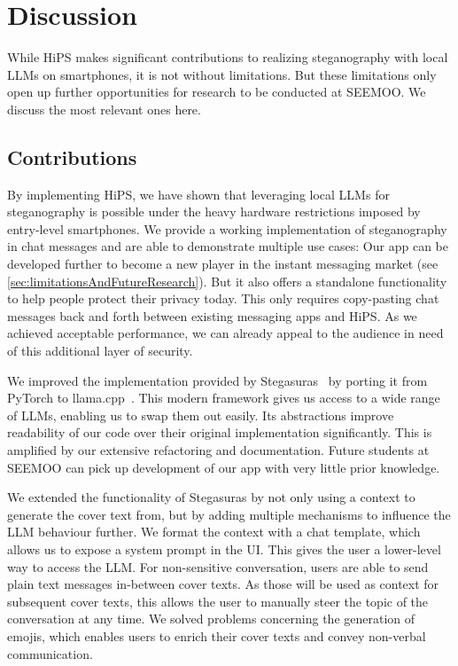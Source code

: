 
\chapter{Discussion}\label{ch:discussion} %
\glsresetall %

While \gls{HiPS} makes significant contributions to realizing steganography with local \glspl{LLM} on smartphones, it is not without limitations. But these limitations only open up further opportunities for research to be conducted at SEEMOO. We discuss the most relevant ones here.

\section{Contributions}
\label{sec:contributions}
By implementing \gls{HiPS}, we have shown that leveraging local \glspl{LLM} for steganography is possible under the heavy hardware restrictions imposed by entry-level smartphones. We provide a working implementation of steganography in chat messages and are able to demonstrate multiple use cases: Our app can be developed further to become a new player in the instant messaging market (see \cref{sec:limitationsAndFutureResearch}). But it also offers a standalone functionality to help people protect their privacy today. This only requires copy-pasting chat messages back and forth between existing messaging apps and \gls{HiPS}. As we achieved acceptable performance, we can already appeal to the audience in need of this additional layer of security.

We improved the implementation provided by Stegasuras~\cite{zieglerNeuralLinguisticSteganography2019} by porting it from PyTorch to llama.cpp~\cite{gerganovGgerganovLlamacpp2024}. This modern framework gives us access to a wide range of \glspl{LLM}, enabling us to swap them out easily. Its abstractions improve readability of our code over their original implementation significantly. This is amplified by our extensive refactoring and documentation. Future students at SEEMOO can pick up development of our app with very little prior knowledge.

We extended the functionality of Stegasuras by not only using a context to generate the cover text from, but by adding multiple mechanisms to influence the \gls{LLM} behaviour further. We format the context with a chat template, which allows us to expose a system prompt in the \gls{UI}. This gives the user a lower-level way to access the \gls{LLM}. For non-sensitive conversation, users are able to send plain text messages in-between cover texts. As those will be used as context for subsequent cover texts, this allows the user to manually steer the topic of the conversation at any time. We solved problems concerning the generation of emojis, which enables users to enrich their cover texts and convey non-verbal communication.

